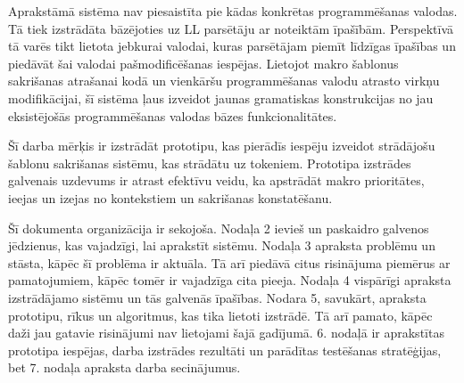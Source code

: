 Aprakstāmā sistēma nav piesaistīta pie kādas konkrētas programmēšanas valodas. Tā tiek izstrādāta bāzējoties uz LL parsētāju ar noteiktām īpašībām. Perspektīvā tā varēs tikt lietota jebkurai valodai, kuras parsētājam piemīt līdzīgas īpašības un piedāvāt šai valodai pašmodificēšanas iespējas. Lietojot makro šablonus sakrišanas atrašanai kodā un vienkāršu programmēšanas valodu atrasto virkņu modifikācijai, šī sistēma ļaus izveidot jaunas gramatiskas konstrukcijas no jau eksistējošās programmēšanas valodas bāzes funkcionalitātes.

Šī darba mērķis ir izstrādāt prototipu, kas pierādīs iespēju izveidot strādājošu šablonu sakrišanas sistēmu, kas strādātu uz tokeniem. Prototipa izstrādes galvenais uzdevums ir atrast efektīvu veidu, ka apstrādāt makro prioritātes, ieejas un izejas no kontekstiem un sakrišanas konstatēšanu.


Šī dokumenta organizācija ir sekojoša. Nodaļa 2 ievieš un paskaidro galvenos jēdzienus, kas vajadzīgi, lai aprakstīt sistēmu. Nodaļa 3 apraksta problēmu un stāsta, kāpēc šī problēma ir aktuāla. Tā arī piedāvā citus risinājuma piemērus ar pamatojumiem, kāpēc tomēr ir vajadzīga cita pieeja. Nodaļa 4 vispārīgi apraksta izstrādājamo sistēmu un tās galvenās īpašības. Nodara 5, savukārt, apraksta prototipu, rīkus un algoritmus, kas tika lietoti izstrādē. Tā arī pamato, kāpēc daži jau gatavie risinājumi nav lietojami šajā gadījumā. 6. nodaļā ir aprakstītas prototipa iespējas, darba izstrādes rezultāti un parādītas testēšanas stratēģijas, bet 7. nodaļa apraksta darba secinājumus.